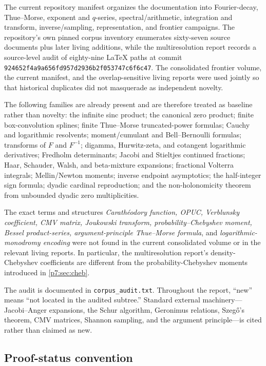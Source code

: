 \documentclass[11pt]{article}
\theoremstyle{definition}
\theoremstyle{remark}
\begin{document}
The current repository manifest organizes the documentation into Fourier-decay,
Thue--Morse, exponent and \(q\)-series, spectral/arithmetic, integration and transform,
inverse/sampling, representation, and frontier campaigns. The repository's own pinned
corpus inventory enumerates sixty-seven source documents plus later living additions, while
the multiresolution report records a source-level audit of eighty-nine \LaTeX{} paths at
commit \texttt{924652f4a9a656fd957d2936b2f053747c6f6c47}. The consolidated frontier volume,
the current manifest, and the overlap-sensitive living reports were used jointly so that
historical duplicates did not masquerade as independent novelty.

The following families are already present and are therefore treated as baseline rather
than novelty: the infinite sinc product; the canonical zero product; finite box-convolution
splines; finite Thue--Morse truncated-power formulas; Cauchy and logarithmic resolvents;
moment/cumulant and Bell--Bernoulli formulas; transforms of \(F\) and \(F^{-1}\); digamma,
Hurwitz-zeta, and cotangent logarithmic derivatives; Fredholm determinants; Jacobi and
Stieltjes continued fractions; Haar, Schauder, Walsh, and beta-mixture expansions;
fractional Volterra integrals; Mellin/Newton moments; inverse endpoint asymptotics; the
half-integer sign formula; dyadic cardinal reproduction; and the non-holonomicity theorem
from unbounded dyadic zero multiplicities.

The exact terms and structures \emph{Carath\'eodory function, OPUC, Verblunsky coefficient,
CMV matrix, Joukowski transform, probability--Chebyshev moment, Bessel product-series,
argument-principle Thue--Morse formula}, and \emph{logarithmic-monodromy encoding} were not
found in the current consolidated volume or in the relevant living reports. In particular,
the multiresolution report's density-Chebyshev coefficients are different from the
probability-Chebyshev moments introduced in \cref{p7:sec:cheb}.

\begin{baselinebox}
The audit is documented in \texttt{corpus\_audit.txt}. Throughout the report, ``new'' means
``not located in the audited \repoPartc{} subtree.'' Standard external machinery---Jacobi--Anger
expansions, the Schur algorithm, Geronimus relations, Szeg\H{o}'s theorem, CMV matrices,
Shannon sampling, and the argument principle---is cited rather than claimed as new.
\end{baselinebox}

\subsection{Proof-status convention}
\end{document}
